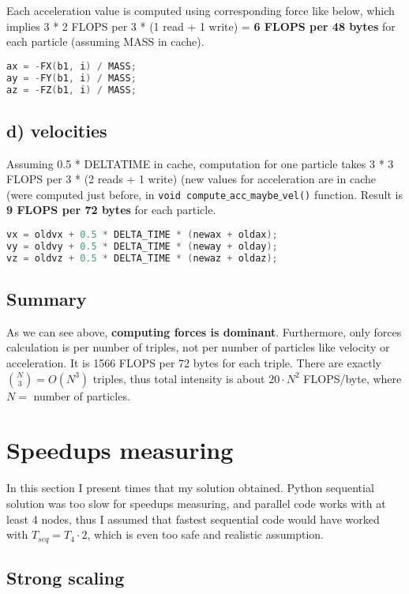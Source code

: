 \documentclass[12pt]{article}
\newcommand{\code}[1]{\texttt{#1}}
\begin{document}
Each acceleration value is computed using corresponding force like below, which implies 3 * 2 FLOPS per 3 * (1 read + 1 write) =  \textbf{6 FLOPS per 48 bytes} for each particle (assuming MASS in cache).
\begin{lstlisting}[language=C]
ax = -FX(b1, i) / MASS;
ay = -FY(b1, i) / MASS;
az = -FZ(b1, i) / MASS;
\end{lstlisting}

\subsection*{d) velocities}

Assuming 0.5 * DELTATIME in cache, computation for one particle takes 3 * 3 FLOPS per 3 * (2 reads + 1 write) (new values for acceleration are in cache (were computed just before, in \code{void compute$\_$acc$\_$maybe$\_$vel()} function. Result is \textbf{9 FLOPS per 72 bytes} for each particle.

\begin{lstlisting}[language=C]
vx = oldvx + 0.5 * DELTA_TIME * (newax + oldax);
vy = oldvy + 0.5 * DELTA_TIME * (neway + olday);
vz = oldvz + 0.5 * DELTA_TIME * (newaz + oldaz);
\end{lstlisting}

\subsection*{Summary}
As we can see above, \textbf{computing forces is dominant}. Furthermore, only forces calculation is per number of triples, not per number of particles like velocity or acceleration. It is 1566 FLOPS per 72 bytes for each triple. There are exactly $\binom{N}{3} = O(N^3)$ triples, thus total intensity is about $20\cdot N^2$ FLOPS/byte, where $N =$ number of particles.


\section*{\fontsize{18}{18}\selectfont Speedups measuring}

In this section I present times that my solution obtained. Python sequential solution was too slow for speedups measuring, and parallel code works with at least 4 nodes, thus I assumed that fastest sequential code would have worked with $T_{seq} = T_4 \cdot 2$, which is even too safe and realistic assumption.

\subsection*{Strong scaling}
\end{document}
